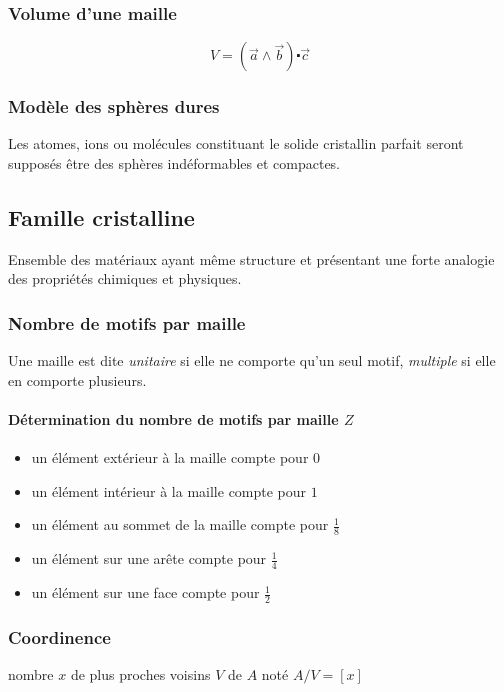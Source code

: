 \subsubsection{Volume d'une maille}
\begin{prop}
    \begin{equation}
        V = (\vec{a} \wedge \vec{b}) \centerdot \vec{c}
        \label{eq:volume}
    \end{equation}
\end{prop}

\subsubsection{Modèle des sphères dures}
Les atomes, ions ou molécules constituant le solide cristallin parfait seront
supposés être des sphères indéformables et compactes.

\subsection{Famille cristalline}
Ensemble des matériaux ayant même structure et présentant une forte analogie des
propriétés chimiques et physiques.

\subsubsection{Nombre de motifs par maille}
Une maille est dite \emph{unitaire} si elle ne comporte qu'un seul motif,
\emph{multiple} si elle en comporte plusieurs.
\paragraph{Détermination du nombre de motifs par maille $Z$}
\begin{itemize}
    \item un élément extérieur à la maille compte pour $0$
    \item un élément intérieur à la maille compte pour $1$
    \item un élément au sommet de la maille compte pour $\frac{1}{8}$
    \item un élément sur une arête compte pour $\frac{1}{4}$
    \item un élément sur une face compte pour $\frac{1}{2}$
\end{itemize}

\subsubsection{Coordinence}
\begin{defi}
    nombre $x$ de plus proches voisins $V$ de $A$ noté $A/V = [x]$
\end{defi}

